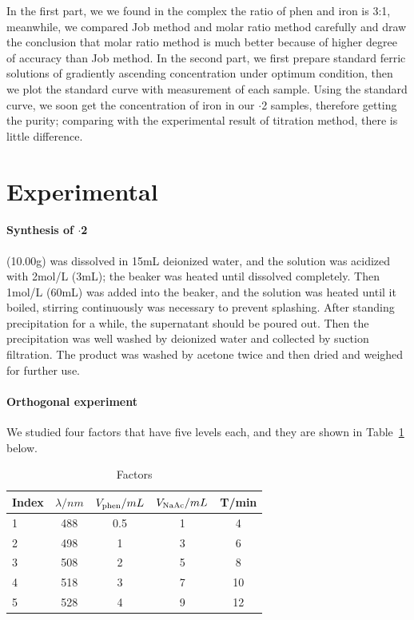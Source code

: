 \documentclass[journal=jacsat,manuscript=article]{achemso}
\newcommand*\mycommand[1]{\texttt{\emph{#1}}}
\begin{document}
In the first part, we we found in the complex the ratio of phen and iron is 3:1, meanwhile, we compared Job method and molar ratio method carefully and draw the conclusion that molar ratio method is much better because of higher degree of accuracy than Job method. In the second part, we first prepare standard ferric solutions of gradiently ascending concentration under optimum condition, then we plot the standard curve with measurement of each sample. Using the standard curve, we soon get the concentration of iron in our $\cdot$2 samples, therefore getting the purity; comparing with the experimental result of titration method, there is little difference.

\section{Experimental}
\paragraph{Synthesis of $\cdot$2}
 (10.00g) was dissolved in 15mL deionized water, and the solution was acidized with 2mol/L  (3mL); the beaker was heated until  dissolved completely. Then 1mol/L  (60mL) was added into the beaker, and the solution was heated until it boiled, stirring continuously was necessary to prevent splashing. After standing precipitation for a while, the supernatant should be poured out. Then the precipitation was well washed by deionized water and collected by suction filtration. The product was washed by acetone twice and then dried and weighed for further use.
\paragraph{Orthogonal experiment}
 We studied four factors that have five levels each, and they are shown in Table~\ref{Tab.Fac} below.
\begin{table}[H]
  \caption{Factors}
  \label{Tab.Fac}
  \begin{tabular}{lcccc}
    \toprule
    Index & $\lambda /nm$ & $V_{\ce{phen}}/mL$ & $V_{\ce{NaAc}}/mL$ & T/min\\
    \midrule
    1     & 488           & 0.5                & 1                  & 4    \\
    2     & 498           & 1                  & 3                  & 6    \\
    3     & 508           & 2                  & 5                  & 8    \\
    4     & 518           & 3                  & 7                  & 10   \\
    5     & 528           & 4                  & 9                  & 12   \\
    \bottomrule
  \end{tabular}
\end{table}
\end{document}
